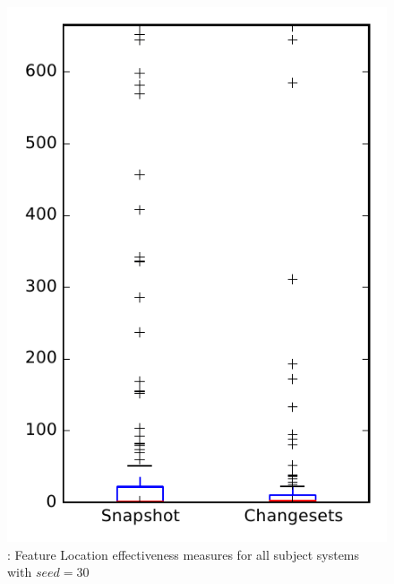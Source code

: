 
\begin{figure}
\centering
\includegraphics[height=0.4\textheight]{figures/flt_seed/rq1_overview_30}
\caption{\rone: Feature Location effectiveness measures for all subject systems with $seed=30$}
\label{fig:flt_seed:rq1:overview}
\end{figure}
